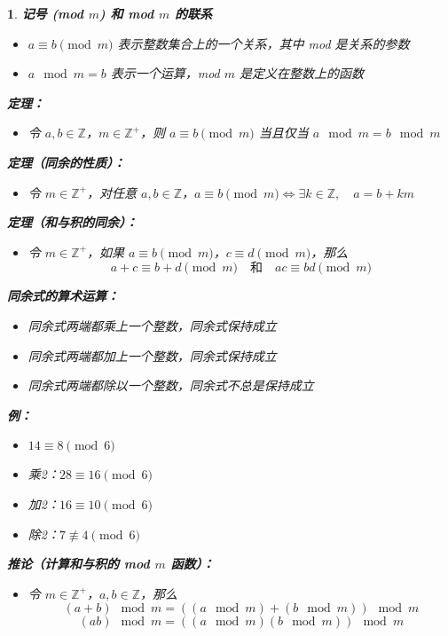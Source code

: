 \documentclass[UTF8]{report}
\theoremstyle{MyLineTheoremStyle} %
\theoremstyle{MyBlockTheoremStyle} %
\theoremstyle{MySubsubsectionStyle} %
\newtheorem{definition}{}
\begin{document}
\begin{definition}
    \textbf{记号 (mod $m$) 和 mod $m$ 的联系}
    \begin{itemize}
        \item $a \equiv b \pmod{m}$ 表示整数集合上的一个关系，其中 mod 是关系的参数
        \item $a \mod m = b$ 表示一个运算，mod $m$ 是定义在整数上的函数
    \end{itemize}

    \textbf{定理：}
    \begin{itemize}
        \item 令 $a, b \in \mathbb{Z}$，$m \in \mathbb{Z}^+$，则 $a \equiv b \pmod{m}$ 当且仅当 $a \mod m = b \mod m$
    \end{itemize}

    \textbf{定理（同余的性质）：}
    \begin{itemize}
        \item 令 $m \in \mathbb{Z}^+$，对任意 $a, b \in \mathbb{Z}$，$a \equiv b \pmod{m} \iff \exists k \in \mathbb{Z}, \quad a = b + km$
    \end{itemize}

    \textbf{定理（和与积的同余）：}
    \begin{itemize}
        \item 令 $m \in \mathbb{Z}^+$，如果 $a \equiv b \pmod{m}$，$c \equiv d \pmod{m}$，那么
        \[
        a + c \equiv b + d \pmod{m} \quad \text{和} \quad ac \equiv bd \pmod{m}
        \]
    \end{itemize}

    \textbf{同余式的算术运算：}
    \begin{itemize}
        \item 同余式两端都乘上一个整数，同余式保持成立
        \item 同余式两端都加上一个整数，同余式保持成立
        \item 同余式两端都除以一个整数，同余式不总是保持成立
    \end{itemize}

    \textbf{例：}
    \begin{itemize}
        \item $14 \equiv 8 \pmod{6}$
        \item 乘2：$28 \equiv 16 \pmod{6}$
        \item 加2：$16 \equiv 10 \pmod{6}$
        \item 除2：$7 \not\equiv 4 \pmod{6}$
    \end{itemize}

    \textbf{推论（计算和与积的 mod $m$ 函数）：}
    \begin{itemize}
        \item 令 $m \in \mathbb{Z}^+$，$a, b \in \mathbb{Z}$，那么
        \[
        (a + b) \mod m = ((a \mod m) + (b \mod m)) \mod m
        \]
        \[
        (ab) \mod m = ((a \mod m) (b \mod m)) \mod m
        \]
    \end{itemize}
\end{definition}
\end{document}
